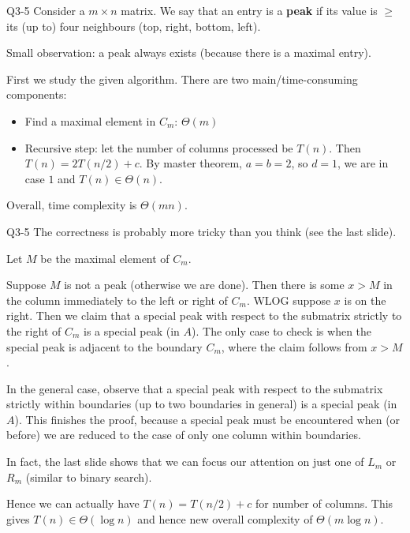 \documentclass{scratcl}
\def\ge{\geqslant}
\begin{document}
\begin{frame}{Q3-5}
  Consider a $m \times n$ matrix. We say that an entry is a \textbf{peak} if its value is $\ge$ its (up to) four neighbours (top, right, bottom, left). 
  \par Small observation: a peak always exists (because there is a maximal entry). 
  \par First we study the given algorithm. There are two main/time-consuming components: 
  \begin{itemize}
    \item Find a maximal element in $C_m$: $\Theta(m)$
    \item Recursive step: let the number of columns processed be $T(n)$. Then $T(n) = 2T(n/2)+c$. By master theorem, $a=b=2$, so $d=1$, we are in case $1$ and $T(n) \in \Theta(n)$. 
  \end{itemize}
  Overall, time complexity is $\Theta(mn)$. 
\end{frame}
\begin{frame}{Q3-5}
  The correctness is probably more tricky than you think (see the last slide). 
  \par Let $M$ be the maximal element of $C_m$. 
  \par Suppose $M$ is not a peak (otherwise we are done). Then there is some $x > M$ in the column immediately to the left or right of $C_m$. WLOG suppose $x$ is on the right. Then we claim that a special peak with respect to the submatrix strictly to the right of $C_m$ is a special peak (in $A$). The only case to check is when the special peak is adjacent to the boundary $C_m$, where the claim follows from $x>M$. 
  \par In the general case, observe that a special peak with respect to the submatrix strictly within boundaries (up to two boundaries in general) is a special peak (in $A$). This finishes the proof, because a special peak must be encountered when (or before) we are reduced to the case of only one column within boundaries. 
\end{frame}
\begin{frame}
  In fact, the last slide shows that we can focus our attention on just one of $L_m$ or $R_m$ (similar to binary search). 
  \par Hence we can actually have $T(n) = T(n/2)+c$ for number of columns. This gives $T(n) \in \Theta(\log{n})$ and hence new overall complexity of $\Theta(m\log{n})$. 
\end{frame}
\end{document}
